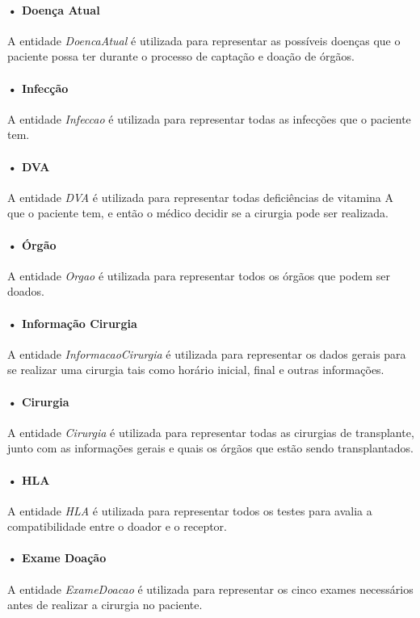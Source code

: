 \documentclass[portuguese,oneside]{tcc}
\begin{document}
\paragraph*{• Doença Atual}
A entidade \textit{DoencaAtual} é utilizada para representar as possíveis doenças que o paciente possa ter durante o processo de captação e doação de órgãos.

\paragraph*{• Infecção}
A entidade \textit{Infeccao} é utilizada para representar todas as infecções que o paciente tem.

\paragraph*{• DVA}
A entidade \textit{DVA} é utilizada para representar todas deficiências de vitamina A que o paciente tem, e então o médico decidir se a cirurgia pode ser realizada.

\paragraph*{• Órgão}
A entidade \textit{Orgao} é utilizada para representar todos os órgãos que podem ser doados.

\paragraph*{• Informação Cirurgia}
A entidade \textit{InformacaoCirurgia} é utilizada para representar os dados gerais para se realizar uma cirurgia tais como horário inicial, final e outras informações.

\paragraph*{• Cirurgia}
A entidade \textit{Cirurgia} é utilizada para representar todas as cirurgias  de transplante, junto com as informações gerais e quais os órgãos que estão sendo transplantados.

\paragraph*{• HLA}
A entidade \textit{HLA} é utilizada para representar todos os testes para avalia a compatibilidade entre o doador e o receptor.

\paragraph*{• Exame Doação}
A entidade \textit{ExameDoacao} é utilizada para representar os cinco exames necessários antes de realizar a cirurgia no paciente.
\end{document}
